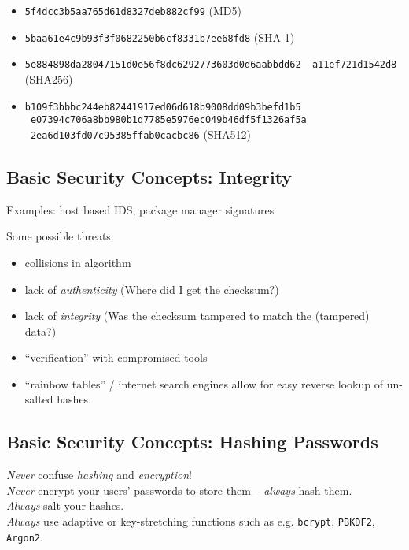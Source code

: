 \documentclass[xga]{xdvislides}
\begin{document}
\begin{itemize}
	\item {\tt 5f4dcc3b5aa765d61d8327deb882cf99} (MD5)
	\item {\tt 5baa61e4c9b93f3f0682250b6cf8331b7ee68fd8} (SHA-1)
	\item {\tt 5e884898da28047151d0e56f8dc6292773603d0d6aabbdd62 \
                   a11ef721d1542d8} (SHA256)
	\item {\tt b109f3bbbc244eb82441917ed06d618b9008dd09b3befd1b5 \
                   e07394c706a8bb980b1d7785e5976ec049b46df5f1326af5a \
                   2ea6d103fd07c95385ffab0cacbc86} (SHA512)
\end{itemize}

\subsection{Basic Security Concepts: Integrity}
Examples: host based IDS, package manager signatures

\vspace{.5in}
Some possible threats:
\begin{itemize}
	\item collisions in algorithm
	\item lack of {\em authenticity} (Where did I get the checksum?)
	\item lack of {\em integrity} (Was the checksum tampered to match the (tampered) data?)
	\item ``verification'' with compromised tools
	\item ``rainbow tables'' / internet search engines allow for easy reverse
		lookup of un-salted hashes.
\end{itemize}

\subsection{Basic Security Concepts: Hashing Passwords}
{\em Never} confuse {\em hashing} and {\em encryption}! \\

{\em Never} encrypt your users' passwords to store them -- {\em always} hash them. \\

\addvspace{.25in}
{\em Always} salt your hashes. \\

{\em Always} use adaptive or key-stretching functions
such as e.g. {\tt bcrypt}, {\tt PBKDF2}, {\tt Argon2}.
\end{document}
